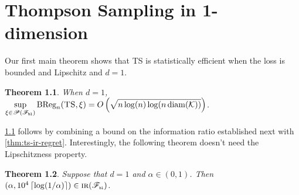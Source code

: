 \documentclass[letter, 12pt]{report}
\newcommand{\pb}{\text{\tiny\texttt{b}}}
\newcommand{\pl}{\text{\tiny\texttt{l}}}
\newcommand{\ceil}[1]{\left\lceil #1 \right\rceil}
\newcommand{\BReg}{\textrm{BReg}}
\newcommand{\cK}{\mathcal K}
\newcommand{\sF}{\mathscr F}
\newcommand{\sP}{\mathscr P}
\newcommand{\diam}{\operatorname{diam}}
\newcommand{\1}{\mathbf{1}}
\newcommand{\IR}{\operatorname{\textsc{ir}}}
\newcommand{\ts}{\textsc{TS}\xspace}
\theoremstyle{plain}
\newtheorem{theorem}{Theorem}
\theoremstyle{definition}
\theoremstyle{remark}
\begin{document}
\chapter{Thompson Sampling in 1-dimension}
Our first main theorem shows that \ts{} is statistically efficient when the loss is bounded and Lipschitz and $d = 1$.
\begin{theorem}\label{thm:ts-1d}
    When $d = 1$, $\displaystyle \sup_{\xi \in \sP(\sF_{\pb\pl})} \BReg_n(\ts, \xi) = O\left(\sqrt{n \log(n) \log(n \diam(\cK))}\right)$.
\end{theorem}

\cref{thm:ts-1d} follows by combining a bound on the information ratio established next with \cref{thm:ts-ir-regret}. Interestingly, the following theorem doesn't need the Lipschitzness property.

\begin{theorem}\label{thm:ts}
    Suppose that $d = 1$ and $\alpha \in (0,1)$.
    Then $(\alpha, 10^4 \ceil{\log(1/\alpha)}) \in \IR(\sF_{\pb\pl})$.
\end{theorem}
\end{document}
